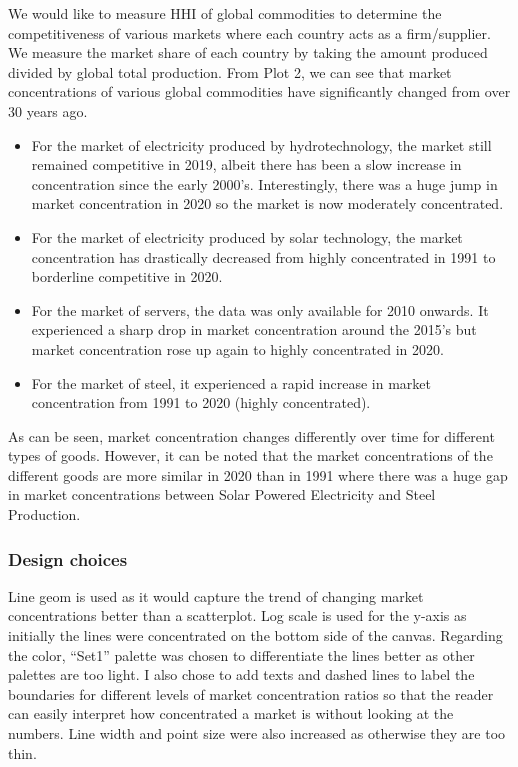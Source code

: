 \documentclass[
]{article}
\providecommand{\tightlist}{%
  \setlength{\itemsep}{0pt}\setlength{\parskip}{0pt}}
\begin{document}
We would like to measure HHI of global commodities to determine the
competitiveness of various markets where each country acts as a
firm/supplier. We measure the market share of each country by taking the
amount produced divided by global total production. From Plot 2, we can
see that market concentrations of various global commodities have
significantly changed from over 30 years ago.

\begin{itemize}
\tightlist
\item
  For the market of electricity produced by hydrotechnology, the market
  still remained competitive in 2019, albeit there has been a slow
  increase in concentration since the early 2000's. Interestingly, there
  was a huge jump in market concentration in 2020 so the market is now
  moderately concentrated.
\item
  For the market of electricity produced by solar technology, the market
  concentration has drastically decreased from highly concentrated in
  1991 to borderline competitive in 2020.
\item
  For the market of servers, the data was only available for 2010
  onwards. It experienced a sharp drop in market concentration around
  the 2015's but market concentration rose up again to highly
  concentrated in 2020.
\item
  For the market of steel, it experienced a rapid increase in market
  concentration from 1991 to 2020 (highly concentrated).
\end{itemize}

As can be seen, market concentration changes differently over time for
different types of goods. However, it can be noted that the market
concentrations of the different goods are more similar in 2020 than in
1991 where there was a huge gap in market concentrations between Solar
Powered Electricity and Steel Production.

\hypertarget{design-choices-1}{%
\subsubsection{Design choices}\label{design-choices-1}}

Line geom is used as it would capture the trend of changing market
concentrations better than a scatterplot. Log scale is used for the
y-axis as initially the lines were concentrated on the bottom side of
the canvas. Regarding the color, ``Set1'' palette was chosen to
differentiate the lines better as other palettes are too light. I also
chose to add texts and dashed lines to label the boundaries for
different levels of market concentration ratios so that the reader can
easily interpret how concentrated a market is without looking at the
numbers. Line width and point size were also increased as otherwise they
are too thin.
\end{document}

